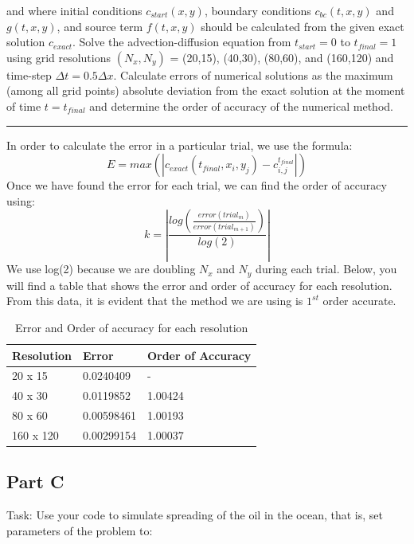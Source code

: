 \documentclass[12pt]{article}
\begin{document}
\noindent and where initial conditions $c_{start}(x,y)$, boundary conditions $c_{bc}(t,x,y)$ and $g(t,x,y)$, and source term $f(t,x,y)$ should be calculated from the given exact solution $c_{exact}$. Solve the advection-diffusion equation from $t_{start} = 0$ to $t_{final} = 1$ using grid resolutions $(N_x, N_y)$ = (20,15), (40,30), (80,60), and (160,120) and time-step $\Delta t = 0.5\Delta x$. Calculate errors of numerical solutions as the maximum (among all grid points) absolute deviation from the exact solution at the moment of time $t = t_{final}$ and determine the order of accuracy of the numerical method.
\begin{center}
\rule{10cm}{0.4pt}
\end{center}
In order to calculate the error in a particular trial, we use the formula:
\begin{equation*}
E = max(|c_{exact}(t_{final},x_i,y_j) - c_{i,j}^{t_{final}}|)
\end{equation*}
Once we have found the error for each trial, we can find the order of accuracy using:
\begin{equation*}
k = \left|\frac{log\left(\frac{error(trial_m)}{error(trial_{m+1})}\right)}{log(2)}\right|
\end{equation*}
We use log(2) because we are doubling $N_x$ and $N_y$ during each trial. Below, you will find a table that shows the error and order of accuracy for each resolution. From this data, it is evident that the method we are using is $1^{st}$ order accurate.
\begin{table}[htb]
\centering
\label{p2_table}
\begin{tabular}{|l|l|l|}
\hline
Resolution & Error      & Order of Accuracy \\ \hline
20 x 15    & 0.0240409  & -                 \\ \hline
40 x 30    & 0.0119852  & 1.00424           \\ \hline
80 x 60    & 0.00598461 & 1.00193           \\ \hline
160 x 120  & 0.00299154 & 1.00037           \\ \hline
\end{tabular}
\caption{Error and Order of accuracy for each resolution}
\end{table}
\subsection*{Part C}
Task: Use your code to simulate spreading of the oil in the ocean, that is, set parameters of the problem to:
\\
\end{document}
